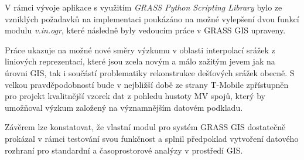 \documentclass[a4paper,12pt,oneside]{report}
\begin{document}
V rámci vývoje aplikace s využitím \textit{GRASS Python Scripting
  Library} bylo ze vzniklých požadavků na implementaci poukázáno na
možné vylepšení dvou funkcí modulu \textit{v.in.ogr}, které následně
byly vedoucím práce v GRASS GIS upraveny.



Práce ukazuje na možné nové směry výzkumu v oblasti
interpolací srážek z linio\-vých reprezentací, které jsou zcela novým a
málo zažitým jevem jak na úrovni GIS, tak i  součástí problematiky
rekonstrukce dešťových srážek obecně. S velkou pravděpodobností bude v
nejbližší době ze strany T-Mobile zpřístupněn pro projekt kvalitnější
vzorek dat z pohledu hustoty MV spojů, který by umožňoval výzkum
založený na významnějším datovém podkladu.

Závěrem lze konstatovat, že vlastní modul pro systém GRASS GIS
dostatečně prokázal v rámci testování svou funkčnost a splnil
předpoklad vytvoření datového rozhraní pro standardní a časoprostorové analýzy v prostředí GIS.
\end{document}
